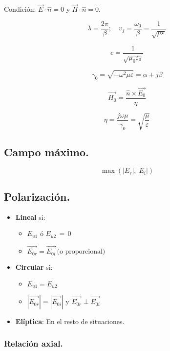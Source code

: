 \documentclass[12pt,a4paper]{article}
\begin{document}
Condición: $ \vec{E} \cdot \hat{n} = 0 $ y $ \vec{H} \cdot \hat{n} = 0 $.

\[ \lambda = \frac{2 \pi}{\beta}; \quad v_f = \frac{\omega_0}{\beta}  =
\frac{1}{\sqrt{\mu \varepsilon}} \]

\[ c = \frac{1}{\sqrt{\mu_0 \varepsilon_0}} \]

\[ \gamma_0 = \sqrt{-\omega^2 \mu \varepsilon} = \alpha + j \beta \]

\[ \vec{H_0} = \frac{\hat{n} \times \vec{E_0}}{\eta} \]

\[ \eta = \frac{j \omega \mu}{\gamma_0} = \sqrt{\frac{\mu}{\varepsilon}} \]

\subsection{Campo máximo.}

\[ \max{\left(|E_r|, |E_i|\right)} \]

\subsection{Polarización.}
\label{sub:polarizacion}

\begin{itemize}
		\item \textbf{Lineal} si:
				\begin{itemize}
						\item $ E_{u1} $ ó $ E_{u2} \, = \, 0$
                        \item $ \vec{E_{0r}} = \vec{E_{0i}} \, \mbox{(o
                            proporcional)} $ 
						
				\end{itemize}
		\item \textbf{Circular} si:
				\begin{itemize}
						\item $ E_{u1} = E_{u2} $ 
						\item $ |\vec{E_{0r}}| = |\vec{E_{0i}}| $ y $ \vec{E_{0r}} \perp \vec{E_{0i}} $ 
				\end{itemize}
		\item \textbf{Elíptica}:
				En el resto de situaciones.
\end{itemize}

\subsubsection{Relación axial.}
\label{ssub:relacion_axial}
\end{document}

